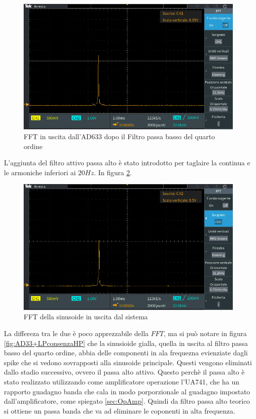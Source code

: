 \documentclass[titlepage]{report}
\begin{document}
	\begin{figure}[H]
		\centering
		\includegraphics[scale = 0.5]{Immagini/fft_ad633+lp4.PNG}
		\caption{FFT in uscita dall'AD633 dopo il Filtro passa basso del quarto ordine}
		\label{fig:FFTAD33+LP4}
	\end{figure}

	L'aggiunta del filtro attivo passa alto è stato introdotto per taglaire la continua e le armoniche inferiori ai $20Hz$.
	In figura \ref{fig:FFTfinale}.


	\begin{figure}[H]
		\centering
		\includegraphics[scale = 0.5]{Immagini/ftt_ad633+lp4+hp1_final.PNG}
		\caption{FFT della sinusoide in uscita dal sistema}
		\label{fig:FFTfinale}
	\end{figure}


	 La differeza tra le due è poco apprezzabile della $FFT$, ma si può notare in figura \ref{fig:AD33+LPconsenzaHP} che la sinusioide gialla, quella in uscita al filtro passa basso del quarto ordine, abbia delle componenti in ala frequezna evienziate dagli spike che si vedono sovrapposti alla sinusoide principale. Questi vengono eliminati dallo stadio successivo, ovvero il passa alto attivo. Questo perchè il passa alto è stato realizzato utilizzando come amplificatore operazione l'UA741, che ha un rapporto guadagno banda che cala in modo porporzionale al guadagno impostato dall'amplificatore, come spiegato \ref{sec:OpAmp}. Quindi da filtro passa alto teorico si ottiene un passa banda che va ad eliminare le coponenti in alta frequenza.
	 
\end{document}

